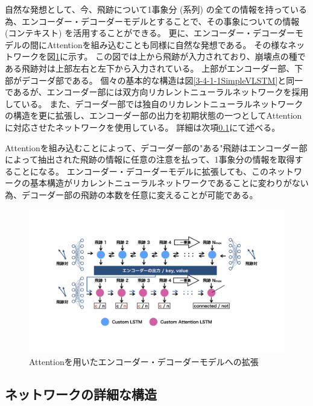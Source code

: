 自然な発想として、今、飛跡について1事象分 (系列) の全ての情報を持っている為、エンコーダー・デコーダーモデルとすることで、その事象についての情報 (コンテキスト) を活用することができる。
更に、エンコーダー・デコーダーモデルの間にAttentionを組み込むことも同様に自然な発想である。
その様なネットワークを図\ref{3-4-1-2EncoderDecoderVLSTM}に示す。
この図では上から飛跡が入力されており、崩壊点の種である飛跡対は上部左右と左下から入力されている。
上部がエンコーダー部、下部がデコーダ部である。
個々の基本的な構造は図\ref{3-4-1-1SimpleVLSTM}と同一であるが、エンコーダー部には双方向リカレントニューラルネットワークを採用している。
また、デコーダー部では独自のリカレントニューラルネットワークの構造を更に拡張し、エンコーダー部の出力を初期状態の一つとしてAttentionに対応させたネットワークを使用している。
詳細は次項\ref{Net:VLSTM:DetailedStructureofVLSTM}にて述べる。

Attentionを組み込むことによって、デコーダー部の"ある"飛跡はエンコーダー部によって抽出された飛跡の情報に任意の注意を払って、1事象分の情報を取得することになる。
エンコーダー・デコーダーモデルに拡張しても、このネットワークの基本構造がリカレントニューラルネットワークであることに変わりがない為、デコーダー部の飛跡の本数を任意に変えることが可能である。

\begin{figure}[htbp]
 \centering
 \includegraphics[trim = 0 80 0 0, width=1.0\textwidth]{Figure/3Networks/3-4-1-2EncoderDecoderVLSTM.png}
 \caption{Attentionを用いたエンコーダー・デコーダーモデルへの拡張}
 \label{3-4-1-2EncoderDecoderVLSTM}
\end{figure}

\subsection{ネットワークの詳細な構造} \label{Net:VLSTM:DetailedStructureofVLSTM}


